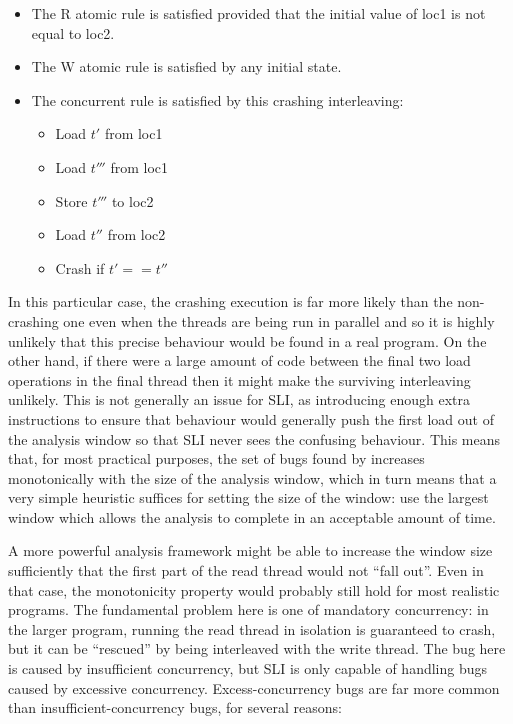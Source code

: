 \begin{itemize}
\item
  The R atomic rule is satisfied provided that the initial value of
  loc1 is not equal to loc2.
\item
  The W atomic rule is satisfied by any initial state.
\item
  The concurrent rule is satisfied by this crashing interleaving:
  \begin{itemize}
  \item Load $t'$ from loc1
  \item Load $t'''$ from loc1
  \item Store $t'''$ to loc2
  \item Load $t''$ from loc2
  \item Crash if $t' == t''$
  \end{itemize}
\end{itemize}

In this particular case, the crashing execution is far more likely
than the non-crashing one even when the threads are being run in
parallel and so it is highly unlikely that this precise behaviour
would be found in a real program.  On the other hand, if there were a
large amount of code between the final two load operations in the
final thread then it might make the surviving interleaving unlikely.
This is not generally an issue for SLI, as introducing enough extra
instructions to ensure that behaviour would generally push the first
load out of the analysis window so that SLI never sees the confusing
behaviour.  This means that, for most practical purposes, the set of
bugs found by increases monotonically with the size of the analysis
window, which in turn means that a very simple heuristic suffices for
setting the size of the window: use the largest window which allows
the analysis to complete in an acceptable amount of time.


A more powerful analysis framework might be able to increase the
window size sufficiently that the first part of the read thread would
not ``fall out''.  Even in that case, the monotonicity property would
probably still hold for most realistic programs.  The fundamental
problem here is one of mandatory concurrency: in the larger program,
running the read thread in isolation is guaranteed to crash, but it
can be ``rescued'' by being interleaved with the write thread.  The
bug here is caused by insufficient concurrency, but SLI is only
capable of handling bugs caused by excessive concurrency.
Excess-concurrency bugs are far more common than
insufficient-concurrency bugs, for several reasons:

